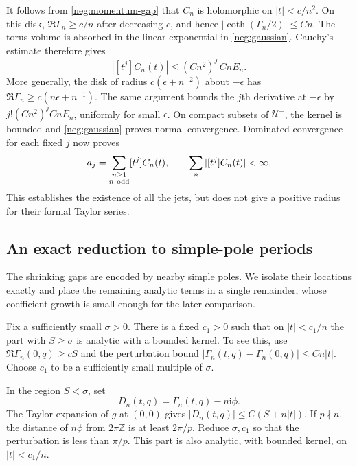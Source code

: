 \documentclass[11pt]{article}
\numberwithin{equation}{section}
\theoremstyle{definition}
\newcommand{\Z}{\mathbb Z}
\newcommand{\ii}{\mathrm i}
\begin{document}
It follows from \eqref{neg:momentum-gap} that \(C_n\) is holomorphic
on \(|t|<c/n^2\).  On this disk,
\(\Re\Gamma_n\ge c/n\) after decreasing \(c\), and hence
\(|\coth(\Gamma_n/2)|\le Cn\).  The torus volume is absorbed in
the linear exponential in \eqref{neg:gaussian}.  Cauchy's estimate
therefore gives
\begin{equation}
 |[t^j]C_n(t)|\le (Cn^2)^j\,CnE_n .
 \label{neg:small-disk}
\end{equation}
More generally, the disk of radius \(c(\epsilon+n^{-2})\) about
\(-\epsilon\) has
\(\Re\Gamma_n\ge c(n\epsilon+n^{-1})\).  The same argument bounds
the \(j\)th derivative at \(-\epsilon\) by
\(j!(Cn^2)^j CnE_n\), uniformly for small \(\epsilon\).
On compact subsets of \(\mathcal U^-\), the kernel is bounded and
\eqref{neg:gaussian} proves normal convergence.  Dominated
convergence for each fixed \(j\) now proves
\begin{equation}
 a_j=\sum_{\substack{n\ge1\\n\ {\rm odd}}}[t^j]C_n(t),
 \qquad
 \sum_n |[t^j]C_n(t)|<\infty .
 \label{neg:jet-sum}
\end{equation}
This establishes the existence of all the jets, but does not give
a positive radius for their formal Taylor series.

\subsection{An exact reduction to simple-pole periods}
\label{neg:pole-reduction}

The shrinking gaps are encoded by nearby simple poles. We isolate
their locations exactly and place the remaining analytic terms in a
single remainder, whose coefficient growth is small enough for the
later comparison.

Fix a sufficiently small \(\sigma>0\).  There is a fixed \(c_1>0\)
such that on \(|t|<c_1/n\) the part with \(S\ge\sigma\) is analytic
with a bounded kernel.  To see this, use
\(\Re\Gamma_n(0,q)\ge cS\) and the perturbation bound
\(|\Gamma_n(t,q)-\Gamma_n(0,q)|\le Cn|t|\).
Choose \(c_1\) to be a sufficiently small multiple of \(\sigma\).

In the region \(S<\sigma\), set
\[
 D_n(t,q)=\Gamma_n(t,q)-n\ii\phi .
 \]
The Taylor expansion of \(g\) at \((0,0)\) gives
\(|D_n(t,q)|\le C(S+n|t|)\).
If \(p\nmid n\), the distance of \(n\phi\) from \(2\pi\Z\) is at
least \(2\pi/p\).  Reduce \(\sigma,c_1\) so that the perturbation
is less than \(\pi/p\).  This part is also analytic, with bounded
kernel, on \(|t|<c_1/n\).
\end{document}
